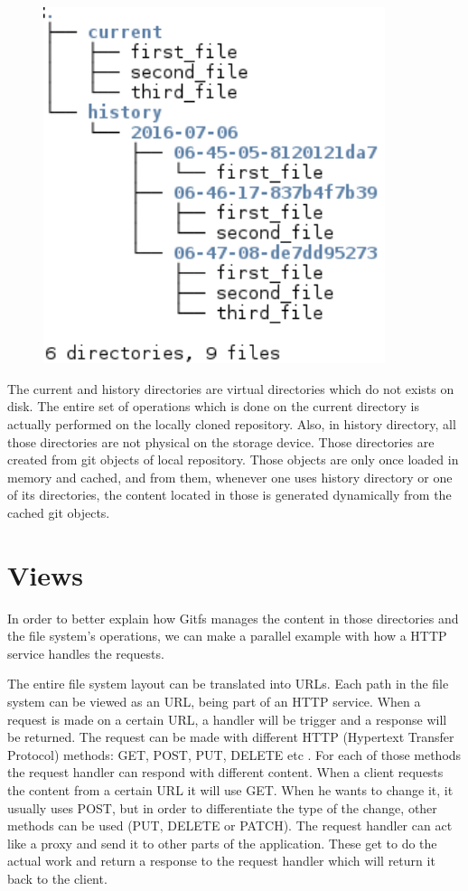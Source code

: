 \begin{figure}[h]
  \begin{center}
    \includegraphics[width=10cm]{layout/gitfs_layout.png}
  \end{center}
\end{figure}

The current and history directories are virtual directories which do not exists on disk. The entire set of operations which is done on the current directory is actually performed on the locally cloned repository. Also, in history directory, all those directories are not physical on the storage device. Those directories are created from git objects of local repository. Those objects are only once loaded in memory and cached, and from them, whenever one uses history directory or one of its directories, the content located in those is generated dynamically from the cached git objects.

\section{Views}
In order to better explain how Gitfs manages the content in those directories and the file system's operations, we can make a parallel example with how a HTTP service handles the requests. 

The entire file system layout can be translated into URLs. Each path in the file system can be viewed as an URL, being part of an HTTP service. When a request is made on a certain URL, a handler will be trigger and a response will be returned. The request can be made with different HTTP (Hypertext Transfer Protocol) methods: GET, POST, PUT, DELETE etc \cite{Fielding1999}. For each of those methods the request handler can respond with different content. When a client requests the content from a certain URL it will use GET. When he wants to change it, it usually uses POST, but in order to differentiate the type of the change, other methods can be used (PUT, DELETE or PATCH). The request handler can act like a proxy and send it to other parts of the application. These get to do the actual work and return a response to the request handler which will return it back to the client.

